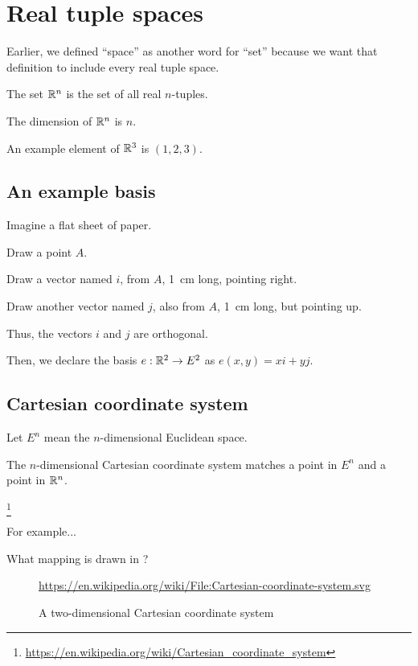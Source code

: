 \chapter{Real tuple spaces}

Earlier, we defined \enquote{space} as another word for \enquote{set} because we want
that definition to include every real tuple space.

The set \(\mathbb{R}^n\) is the set of all real \(n\)-tuples.

The dimension of \(\mathbb{R}^n\) is \(n\).

An example element of \(\mathbb{R}^3\) is \((1,2,3)\).

\section{An example basis}

Imagine a flat sheet of paper.

Draw a point \(A\).

Draw a vector named \(i\), from \(A\), \SI{1}{cm} long, pointing right.

Draw another vector named \(j\), also from \(A\), \SI{1}{cm} long, but pointing up.

Thus, the vectors \(i\) and \(j\) are orthogonal.

Then, we declare the basis
\( e : \mathbb{R}^2 \to E^2 \) as \( e(x,y) = xi + yj \).%

\section{Cartesian coordinate system}

Let \(E^n\) mean the \(n\)-dimensional Euclidean space.

The \(n\)-dimensional Cartesian coordinate system matches
a point in \(E^n\) and a point in \(\mathbb{R}^n\).

\footnote{\url{https://en.wikipedia.org/wiki/Cartesian_coordinate_system}}

For example...

What mapping is drawn in ?

\begin{figure}[h]
    \centering
    \url{https://en.wikipedia.org/wiki/File:Cartesian-coordinate-system.svg}
    \caption{A two-dimensional Cartesian coordinate system}
    \label{fig:a-2d-cartesian-coordinate-system}
\end{figure}

